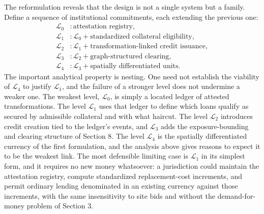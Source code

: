 \documentclass[11pt]{article}
\theoremstyle{definition}
\begin{document}
The reformulation reveals that the design is not a single system but a family. Define a sequence of institutional commitments, each extending the previous one:
\begin{equation}
\begin{aligned}
\mathcal L_0 &: \text{attestation registry},\\
\mathcal L_1 &: \mathcal L_0+\text{standardized collateral eligibility},\\
\mathcal L_2 &: \mathcal L_1+\text{transformation-linked credit issuance},\\
\mathcal L_3 &: \mathcal L_2+\text{graph-structured clearing},\\
\mathcal L_4 &: \mathcal L_3+\text{spatially differentiated units}.
\end{aligned}
\label{eq:hierarchy}
\end{equation}
The important analytical property is nesting. One need not establish the viability of $\mathcal L_4$ to justify $\mathcal L_1$, and the failure of a stronger level does not undermine a weaker one. The weakest level, $\mathcal L_0$, is simply a located ledger of attested transformations. The level $\mathcal L_1$ uses that ledger to define which loans qualify as secured by admissible collateral and with what haircut. The level $\mathcal L_2$ introduces credit creation tied to the ledger's events, and $\mathcal L_3$ adds the exposure-bounding and clearing structure of Section 8. The level $\mathcal L_4$ is the spatially differentiated currency of the first formulation, and the analysis above gives reasons to expect it to be the weakest link. The most defensible limiting case is $\mathcal L_1$ in its simplest form, and it requires no new money whatsoever: a jurisdiction could maintain the attestation registry, compute standardized replacement-cost increments, and permit ordinary lending denominated in an existing currency against those increments, with the same insensitivity to site bids and without the demand-for-money problem of Section 3.
\end{document}
